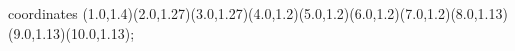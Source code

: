 					coordinates { (1.0,1.4)(2.0,1.27)(3.0,1.27)(4.0,1.2)(5.0,1.2)(6.0,1.2)(7.0,1.2)(8.0,1.13)(9.0,1.13)(10.0,1.13)};